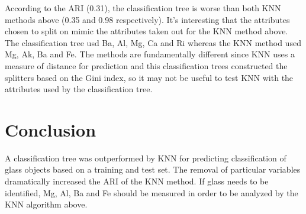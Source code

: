 \documentclass[12pt]{article}
\begin{document}
According to the ARI (0.31), the classification tree is worse than both KNN methods above (0.35 and 0.98 respectively). It's interesting that the attributes chosen to split on mimic the attributes taken out for the KNN method above. The classification tree usd Ba, Al, Mg, Ca and Ri whereas the KNN method used Mg, Ak, Ba and Fe. The methods are fundamentally different since KNN uses a measure of distance for prediction and this classification trees constructed the splitters based on the Gini index, so it may not be useful to test KNN with the attributes used by the classification tree. 


\section{Conclusion}
A classification tree was outperformed by KNN for predicting classification of glass objects based on a training and test set. The removal of particular variables dramatically increased the ARI of the KNN method. If glass needs to be identified, Mg, Al, Ba and Fe should be measured in order to be analyzed by the KNN algorithm above. 

\newpage

{}
\end{document}
